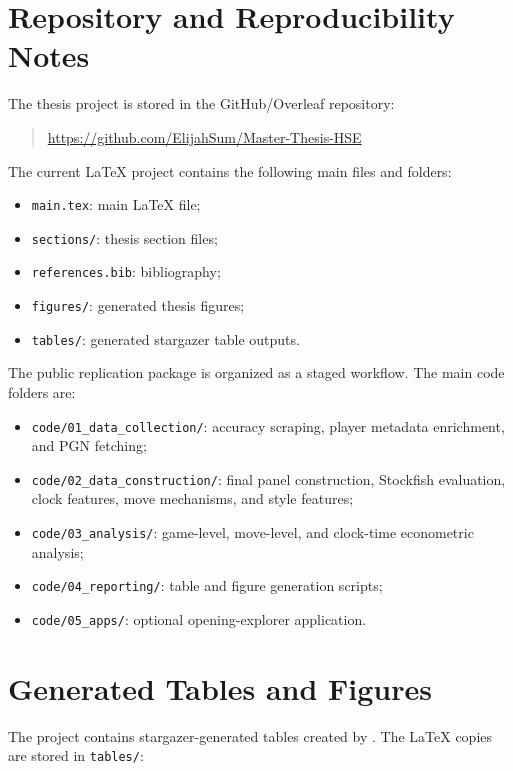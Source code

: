 \section{Repository and Reproducibility Notes}

The thesis project is stored in the GitHub/Overleaf repository:

\begin{quote}
\url{https://github.com/ElijahSum/Master-Thesis-HSE}
\end{quote}

The current LaTeX project contains the following main files and folders:

\begin{itemize}
    \item \texttt{main.tex}: main LaTeX file;
    \item \texttt{sections/}: thesis section files;
    \item \texttt{references.bib}: bibliography;
    \item \texttt{figures/}: generated thesis figures;
    \item \texttt{tables/}: generated stargazer table outputs.
\end{itemize}

The public replication package is organized as a staged workflow. The main code folders are:

\begin{itemize}
    \item \texttt{code/01\_data\_collection/}: accuracy scraping, player metadata enrichment, and PGN fetching;
    \item \texttt{code/02\_data\_construction/}: final panel construction, Stockfish evaluation, clock features, move mechanisms, and style features;
    \item \texttt{code/03\_analysis/}: game-level, move-level, and clock-time econometric analysis;
    \item \texttt{code/04\_reporting/}: table and figure generation scripts;
    \item \texttt{code/05\_apps/}: optional opening-explorer application.
\end{itemize}

\section{Generated Tables and Figures}

The project contains stargazer-generated tables created by . The LaTeX copies are stored in \texttt{tables/}:

